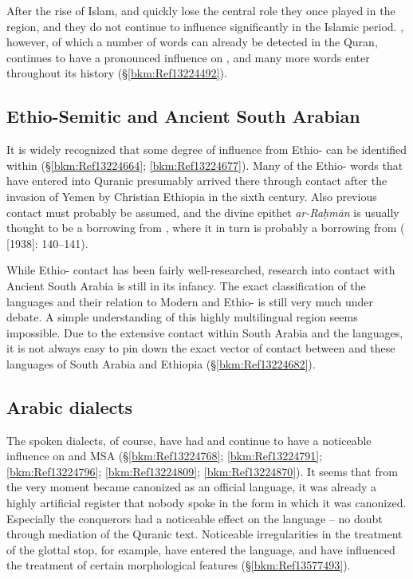 \documentclass[output=paper]{langsci/langscibook}
\begin{document}
After the rise of Islam,  and  quickly lose the central role they once played in the region, and they do not continue to influence  significantly in the Islamic period. , however, of which a number of words can already be detected in the {Quran}, continues to have a pronounced influence on , and many more  words enter  throughout its history (§\ref{bkm:Ref13224492}).

\subsection{Ethio-Semitic and Ancient South Arabian}

It is widely recognized that some degree of influence from Ethio- can be identified within  (§\ref{bkm:Ref13224664}; \ref{bkm:Ref13224677}). Many of the Ethio- words that have entered into Quranic  presumably arrived there through  contact after the invasion of {Yemen} by Christian Ethiopia in the sixth century. Also previous  contact must probably be assumed, and the divine epithet \textit{ar-Raḥmān} is usually thought to be a borrowing from , where it in turn is probably a borrowing from  (\citealt{Jeffrey2007} [1938]: 140--141). 

While Ethio- contact has been fairly well-researched, research into contact with Ancient South Arabia is still in its infancy. The exact classification of the  languages and their relation to Modern  and Ethio- is still very much under debate. A simple understanding of this highly multilingual region seems impossible. Due to the extensive contact within South Arabia and the  languages, it is not always easy to pin down the exact vector of contact between  and these languages of South Arabia and Ethiopia (§\ref{bkm:Ref13224682}).

\subsection{\label{bkm:Ref13224768}Arabic dialects}

The spoken  dialects, of course, have had and continue to have a noticeable influence on  and MSA (§\ref{bkm:Ref13224768}; \ref{bkm:Ref13224791}; \ref{bkm:Ref13224796}; \ref{bkm:Ref13224809}; \ref{bkm:Ref13224870}). It seems that from the very moment  became canonized as an official language, it was already a highly artificial {register} that nobody spoke in the form in which it was canonized. Especially the  conquerors had a noticeable effect on the language – no doubt through mediation of the Quranic text. Noticeable irregularities in the treatment of the glottal stop, for example, have entered the language, and have influenced the treatment of certain morphological features (§\ref{bkm:Ref13577493}).
\end{document}
